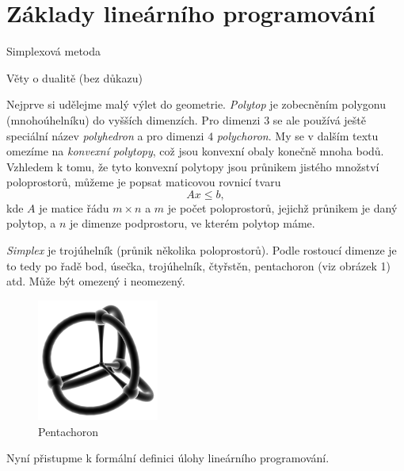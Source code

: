 \section{Základy lineárního programování}

\begin{pozadavky}
\begin{pitemize}
	\item Simplexová metoda
	\item Věty o dualitě (bez důkazu)
\end{pitemize}
\end{pozadavky}


Nejprve si udělejme malý výlet do geometrie. {\it Polytop} je zobecněním polygonu
(mnohoúhelníku) do vyšších dimenzích. Pro dimenzi $3$ se ale používá ještě speciální
název {\it polyhedron} a pro dimenzi $4$ {\it polychoron}. My se v dalším textu
omezíme na {\it konvexní polytopy}, což jsou konvexní obaly konečně mnoha bodů.
Vzhledem k tomu, že tyto konvexní polytopy jsou průnikem jistého množství poloprostorů,
můžeme je popsat maticovou rovnicí tvaru \[Ax\leq b,\] kde $A$ je matice řádu $m\times n$
a $m$ je počet poloprostorů, jejichž průnikem je daný polytop,
a $n$ je dimenze podprostoru, ve kterém polytop máme.

{\it Simplex} je  trojúhelník (průnik několika poloprostorů). Podle rostoucí dimenze je to tedy po řadě bod, úsečka, trojúhelník, čtyřstěn, pentachoron (viz obrázek 1) atd. Může být omezený i neomezený.

\begin{figure}[h]
\label{obr1}
\begin{center}
\includegraphics[width=4cm]{matematika/obrazky/4simplex.png}
\caption{Pentachoron}
\end{center}
\end{figure}

Nyní přistupme k formální definici úlohy lineárního programování.

